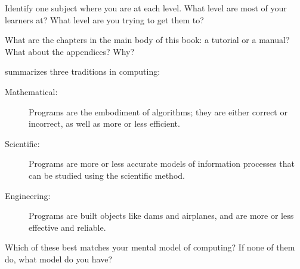 Identify one subject where you are at each level.  What level are most
of your learners at?  What level are you trying to get them to?


What are the chapters in the main body of this book: a tutorial or a
manual?  What about the appendices?  Why?


\cite{Tedr2008} summarizes three traditions in computing:

\begin{description}

\item[Mathematical:] Programs are the embodiment of algorithms; they
  are either correct or incorrect, as well as more or less efficient.

\item[Scientific:] Programs are more or less accurate models of
  information processes that can be studied using the scientific
  method.

\item[Engineering:] Programs are built objects like dams and
  airplanes, and are more or less effective and reliable.

\end{description}

\noindent
Which of these best matches your mental model of computing?  If none
of them do, what model do you have?
